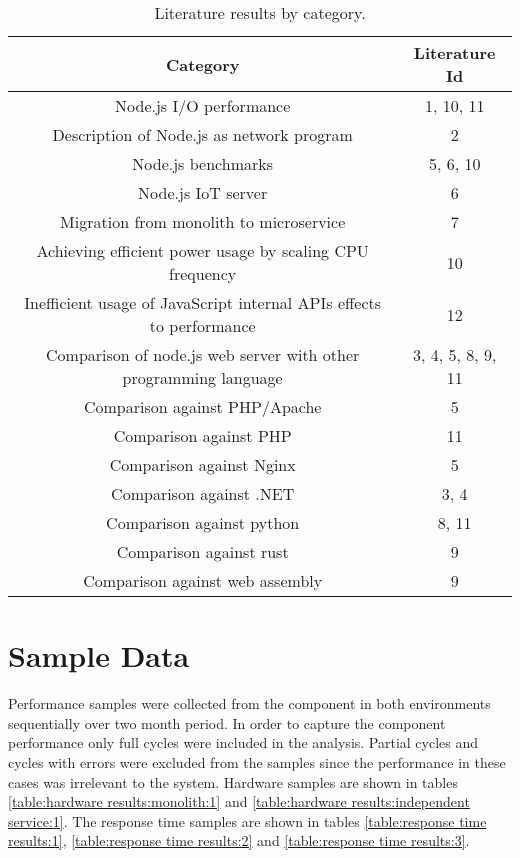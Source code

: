 \begin{table}[ht!]
    \begin{tabular}{|c c|} 
        \hline
        Category
        & Literature Id
        \\ 
        \hline\hline
        Node.js I/O performance
        & 1, 10, 11
        \\ 
        \hline
        Description of Node.js as network program
        & 2
        \\ 
        \hline
        Node.js benchmarks
        & 5, 6, 10
        \\ 
        \hline
        Node.js IoT server
        & 6
        \\ 
        \hline
        Migration from monolith to microservice
        & 7
        \\ 
        \hline
        Achieving efficient power usage by scaling CPU frequency
        & 10
        \\ 
        \hline
        Inefficient usage of JavaScript internal APIs effects to performance
        & 12
        \\ 
        \hline
        Comparison of node.js web server with other programming language
        & 3, 4, 5, 8, 9, 11
        \\ 
        \hline
        Comparison against PHP/Apache
        & 5
        \\ 
        \hline
        Comparison against PHP
        & 11
        \\ 
        \hline
        Comparison against Nginx
        & 5
        \\
        \hline
        Comparison against .NET
        & 3, 4
        \\
        \hline
        Comparison against python
        & 8, 11
        \\
        \hline
        Comparison against rust
        & 9
        \\
        \hline
        Comparison against web assembly
        & 9
        \\
        \hline
    \end{tabular}    
    \caption{Literature results by category.}
    \label{table:literature:resulstByCategory}
\end{table}

\section{Sample Data}
Performance samples were collected from the component in both environments sequentially over two month period.
In order to capture the component performance only full cycles were included in the analysis.
Partial cycles and cycles with errors were excluded from the samples since the performance in these cases was irrelevant to the system.
Hardware samples are shown in tables \ref{table:hardware results:monolith:1} and \ref{table:hardware results:independent service:1}.
The response time samples are shown in tables \ref{table:response time results:1}, \ref{table:response time results:2} and \ref{table:response time results:3}.

